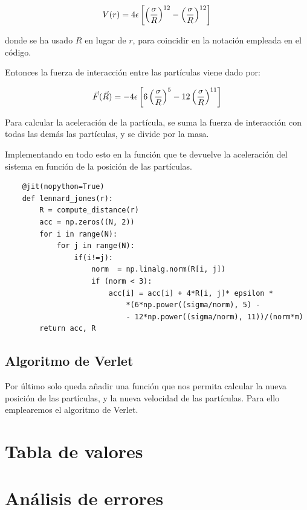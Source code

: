 \documentclass[11pt, twoside]{article} %
\begin{document}
\begin{equation}
    V(r) = 4\epsilon\left[\left(\frac{\sigma}{R}\right)^{12}-
        \left(\frac{\sigma}{R}\right)^{12}\right]
    \label{eq:Lennard_Jones_potential}
\end{equation}

donde se ha usado $R$ en lugar de $r$, para coincidir en la notación empleada en 
el código.

\vspace{3mm}

Entonces la fuerza de interacción entre las partículas viene dado por:

\begin{equation}
    \vec{F}(\vec{R}) =  - 4\epsilon\left[6\left(\frac{\sigma}{R}\right)^{5}-
    12\left(\frac{\sigma}{R}\right)^{11}\right]
\end{equation}

Para calcular la aceleración de la partícula, se suma la fuerza de interacción con
todas las demás las partículas, y se divide por la masa.

Implementando en todo esto en la función que te devuelve la aceleración del sistema
en función de la posición de las partículas.

\begin{verbatim}
    @jit(nopython=True)
    def lennard_jones(r):
        R = compute_distance(r)
        acc = np.zeros((N, 2))
        for i in range(N):
            for j in range(N):
                if(i!=j):
                    norm  = np.linalg.norm(R[i, j])
                    if (norm < 3):
                        acc[i] = acc[i] + 4*R[i, j]* epsilon * 
                            *(6*np.power((sigma/norm), 5) -
                            - 12*np.power((sigma/norm), 11))/(norm*m)
        return acc, R
\end{verbatim}

\subsection{Algoritmo de Verlet}

Por último solo queda añadir una función que nos permita calcular la nueva posición
de las partículas, y la nueva velocidad de las partículas. Para ello emplearemos el
algoritmo de Verlet. 

\newpage

\appendix

\section{Tabla de valores}


\newpage

\section{Análisis de errores}
\end{document}
